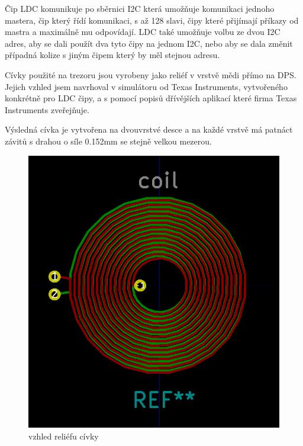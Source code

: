 Čip LDC komunikuje po sběrnici I2C která umožňuje komunikaci jednoho mastera, čip který řídí komunikaci, s až 128 slavi, čipy které přijímají příkazy
od mastra a maximálně mu odpovídají. LDC také umožňuje volbu ze dvou I2C adres, aby se dali použít dva tyto čipy na jednom I2C, nebo aby se dala změnit 
případná kolize s jiným čipem který by měl stejnou adresu.

\newpage

Cívky použité na trezoru jsou vyrobeny jako reliéf v vrstvě mědi přímo na DPS. Jejich vzhled jsem navrhoval v simulátoru od Texas Instruments, 
vytvořeného konkrétně pro LDC čipy, a s pomocí popisů dřívějších aplikací které firma Texas Instruments zveřejňuje.


Výsledná cívka je vytvořena na dvouvrstvé desce a na každé vrstvě má patnáct závitů s drahou o síle 0.152mm se stejně velkou mezerou.

\begin{figure}[htbp]
    \centering
    \includegraphics[width=\textwidth]{kapitoly/obrazky/E4/elektronika_tlakove_desky/civka.png}
    \caption{vzhled reliéfu cívky}
    \label{fig:E4-relief_civka}
\end{figure}

